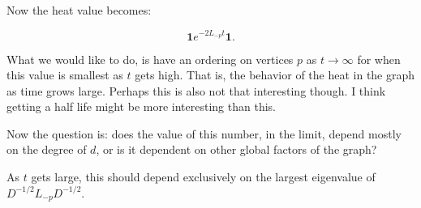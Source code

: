 Now the heat value becomes:

\[ \textbf{1} e^{-2L_{-p}t} \textbf{1}. \]

What we would like to do, is have an ordering on vertices $p$ as
$t \rightarrow \infty$ for when this value is smallest as $t$
gets high. That is, the behavior of the heat in the graph as time
grows large. Perhaps this is also not that interesting though. I
think getting a half life might be more interesting than this.

Now the question is: does the value of this number, in the limit,
depend mostly on the degree of $d$, or is it dependent on
other global factors of the graph?

As $t$ gets large, this should depend exclusively on the largest
eigenvalue of $D^{-1/2}L_{-p}D^{-1/2}$.

